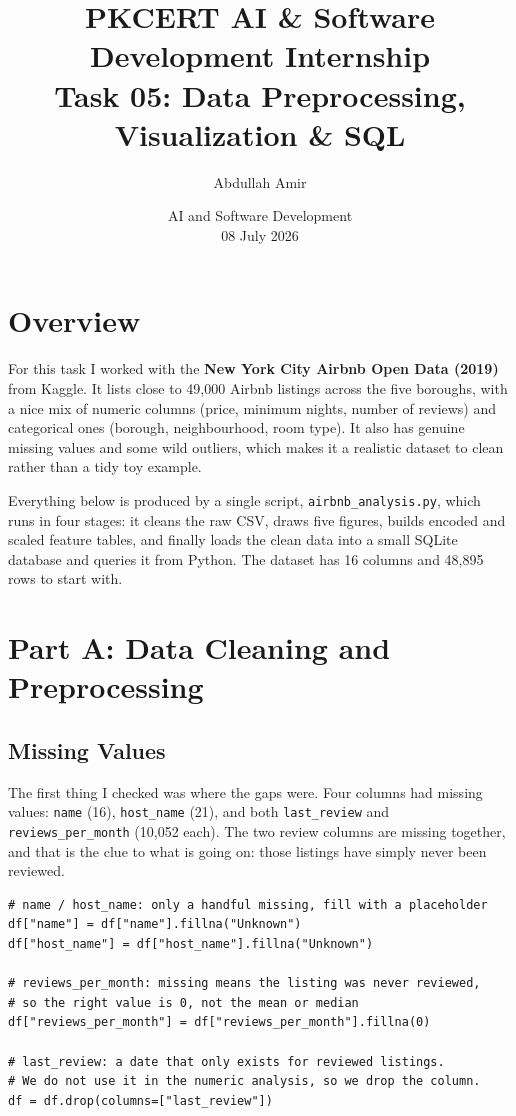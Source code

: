 \documentclass[11pt,a4paper]{article}
\title{\vspace{-1.5cm}\textbf{PKCERT AI \& Software Development Internship \\ Task 05: Data Preprocessing, Visualization \& SQL}}
\author{Abdullah Amir}
\date{AI and Software Development \\ 08 July 2026}
\begin{document}
\maketitle
\vspace{-1cm}

\tableofcontents
\vspace{0.5cm}

\section*{Overview}
For this task I worked with the \textbf{New York City Airbnb Open Data (2019)} from Kaggle. It lists close to 49,000 Airbnb listings across the five boroughs, with a nice mix of numeric columns (price, minimum nights, number of reviews) and categorical ones (borough, neighbourhood, room type). It also has genuine missing values and some wild outliers, which makes it a realistic dataset to clean rather than a tidy toy example.

Everything below is produced by a single script, \texttt{airbnb\_analysis.py}, which runs in four stages: it cleans the raw CSV, draws five figures, builds encoded and scaled feature tables, and finally loads the clean data into a small SQLite database and queries it from Python. The dataset has 16 columns and 48,895 rows to start with.

\section*{Part A: Data Cleaning and Preprocessing}

\subsection*{Missing Values}
The first thing I checked was where the gaps were. Four columns had missing values: \texttt{name} (16), \texttt{host\_name} (21), and both \texttt{last\_review} and \texttt{reviews\_per\_month} (10,052 each). The two review columns are missing together, and that is the clue to what is going on: those listings have simply never been reviewed.

\begin{lstlisting}[style=py, caption={Handling the missing values column by column.}]
# name / host_name: only a handful missing, fill with a placeholder
df["name"] = df["name"].fillna("Unknown")
df["host_name"] = df["host_name"].fillna("Unknown")

# reviews_per_month: missing means the listing was never reviewed,
# so the right value is 0, not the mean or median
df["reviews_per_month"] = df["reviews_per_month"].fillna(0)

# last_review: a date that only exists for reviewed listings.
# We do not use it in the numeric analysis, so we drop the column.
df = df.drop(columns=["last_review"])
\end{lstlisting}
\end{document}
